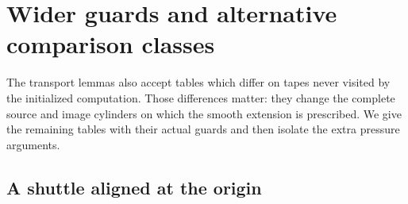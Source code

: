 \section{Wider guards and alternative comparison classes}
\label{sec:bb-guarded}

The transport lemmas also accept tables which differ on tapes never
visited by the initialized computation.  Those differences matter:
they change the complete source and image cylinders on which the
smooth extension is prescribed.  We give the remaining tables with
their actual guards and then isolate the extra pressure arguments.

\subsection{A shuttle aligned at the origin}
\label{sec:bb-shuttle-periodic}

